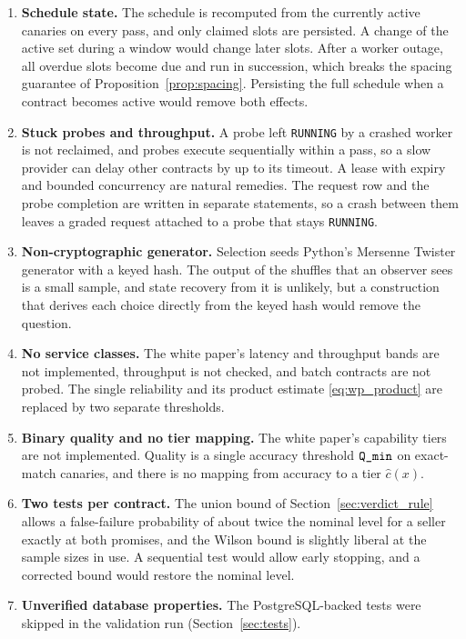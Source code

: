 \begin{enumerate}
    independence assumption in Proposition~\ref{prop:acceptance} is
    optimistic. Calibration at a positive temperature, or with paraphrased
    prompts, would give more independent samples.
  \item \textbf{Schedule state.} The schedule is recomputed from the currently
    active canaries on every pass, and only claimed slots are persisted. A
    change of the active set during a window would change later slots. After a
    worker outage, all overdue slots become due and run in succession, which
    breaks the spacing guarantee of Proposition~\ref{prop:spacing}. Persisting
    the full schedule when a contract becomes active would remove both effects.
  \item \textbf{Stuck probes and throughput.} A probe left \texttt{RUNNING} by a
    crashed worker is not reclaimed, and probes execute sequentially within a
    pass, so a slow provider can delay other contracts by up to its timeout. A
    lease with expiry and bounded concurrency are natural remedies. The request
    row and the probe completion are written in separate statements, so a crash
    between them leaves a graded request attached to a probe that stays
    \texttt{RUNNING}.
  \item \textbf{Non-cryptographic generator.} Selection seeds Python's
    Mersenne Twister generator with a keyed hash. The output of the shuffles
    that an observer sees is a small sample, and state recovery from it is
    unlikely, but a construction that derives each choice directly from the
    keyed hash would remove the question.
  \item \textbf{No service classes.} The white paper's latency and throughput
    bands are not implemented, throughput is not checked, and batch contracts
    are not probed. The single reliability and its product estimate
    \eqref{eq:wp_product} are replaced by two separate thresholds.
  \item \textbf{Binary quality and no tier mapping.} The white paper's capability
    tiers are not implemented. Quality is a single accuracy threshold
    $\textnormal{\texttt{Q\_min}}$ on exact-match canaries, and there is no mapping from accuracy to a
    tier $\hat c(x)$.
  \item \textbf{Two tests per contract.} The union bound of
    Section~\ref{sec:verdict_rule} allows a false-failure probability of about
    twice the nominal level for a seller exactly at both promises, and the
    Wilson bound is slightly liberal at the sample sizes in use. A sequential
    test would allow early stopping, and a corrected bound would restore the
    nominal level.
  \item \textbf{Unverified database properties.} The PostgreSQL-backed tests
    were skipped in the validation run (Section~\ref{sec:tests}).
\end{enumerate}
